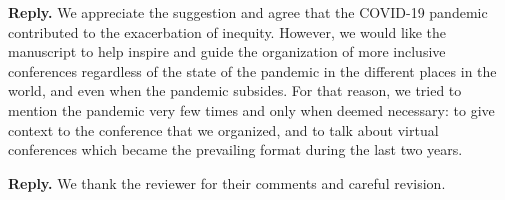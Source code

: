 \documentclass{article}
\newenvironment{Reply}{\noindent\color{BlueViolet}\textbf{Reply.}}{\vspace{1em}}
\begin{document}
\begin{Reply}
    We appreciate the suggestion and agree that the COVID-19 pandemic contributed to the exacerbation of inequity. 
    However, we would like the manuscript to help inspire and guide the organization of more inclusive conferences regardless of the state of the pandemic in the different places in the world, and even when the pandemic subsides. For that reason, we tried to mention the pandemic very few times and only when deemed necessary: to give context to the conference that we organized, and to talk about virtual conferences which became the prevailing format during the last two years.  
\end{Reply}

\begin{Reply}
    We thank the reviewer for their comments and careful revision.
\end{Reply}
\end{document}
